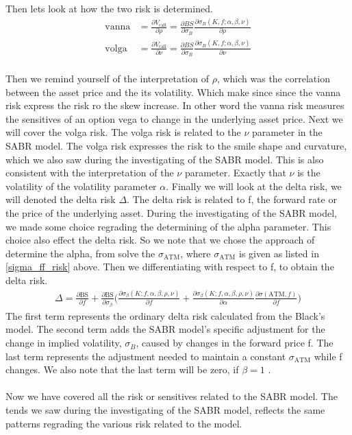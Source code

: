 \\\\
Then lets look at how the two risk is determined. 
\begin{align*}
    \text{vanna} &= \frac{\partial V_{\text{call}}}{\partial \rho} = \frac{\partial BS}{\partial \sigma_B} \frac{\partial \sigma_B(K, f; \alpha, \beta, \nu)}{\partial \rho} \\
    \text{volga} &= \frac{\partial V_{\text{call}}}{\partial \nu} = \frac{\partial BS}{\partial \sigma_B} \frac{\partial \sigma_B(K, f; \alpha, \beta, \nu)}{\partial \nu}
\end{align*}
\\
Then we remind yourself of the interpretation of $\rho$,
which was the correlation between the asset price and the its 
volatility. Which make since since the vanna risk express
the risk ro the skew increase. In other word the vanna risk 
measures the sensitives of an option  vega to change in 
the underlying asset price. Next we will cover the volga risk.
The volga risk is related to the $\nu$ parameter in the SABR model. 
The volga risk expresses the risk to the smile shape and curvature,
which we also saw during the investigating of the SABR model. 
This is also consistent with the interpretation of the $\nu$ parameter. 
Exactly that $\nu$ is the volatility of the volatility parameter $\alpha$.
\newpage
\noindent
Finally we will look at the delta risk, we will denoted
the delta risk $\Delta$. The delta risk is related to f, the 
forward rate or the price of the underlying asset. 
During the investigating of the SABR model, we made
some choice regrading the determining of the alpha parameter.
This choice also effect the delta risk. So we note that
we chose the approach of determine the alpha, from solve the
$\sigma_{\text{ATM}}$, where $\sigma_{\text{ATM}}$ is given as 
listed in \autoref{sigma_ff_risk} above. 
Then we differentiating with respect to f, to obtain the delta risk. 
\begin{align}
    \Delta = \frac{\partial \text{BS}}{\partial f} +
     \frac{\partial \text{BS}}{\partial \sigma_\beta} 
     \Big({\frac{\partial \sigma_\beta(K; f, \alpha, \beta, \rho, \nu)}
     {\partial f}  + \frac{\partial \sigma_\beta(K; f, \alpha, \beta,
     \rho, \nu)}{\partial \alpha} 
     \frac{\partial \sigma(\text{ATM}, f)}{\partial f}}\Big)
\end{align}
The first term represents the ordinary delta risk calculated from 
the Black's model. The second term adds the SABR model's
 specific adjustment for the change in implied volatility, 
$\sigma_B$, caused by changes in the forward price f.
The last term represents the adjustment needed to maintain a constant 
$\sigma_{\text{ATM}}$ while f changes.
We also note that the last term will be zero, if $\beta=1$ \cite{Smile}.
\\\\
Now we have covered all the risk or sensitives related to the SABR model. 
The tends we saw during the investigating of the SABR model, reflects
the same patterns regrading the various risk related to the model. 